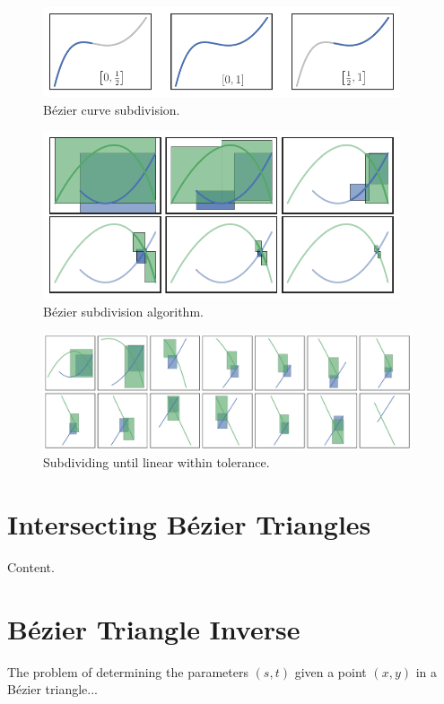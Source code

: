 \begin{figure}
  \includegraphics[width=0.9375\textwidth]{../images/curved-mesh/subdivide_curve.pdf}
  \centering
  \caption{B\'{e}zier curve subdivision.}
  \label{fig:bezier-curve-subdivision}
\end{figure}

\begin{figure}
  \includegraphics[width=0.9375\textwidth]{../images/curved-mesh/subdivision_process.pdf}
  \centering
  \caption{B\'{e}zier subdivision algorithm.}
  \label{fig:bezier-subdivision-process}
\end{figure}

\begin{figure}
  \includegraphics[width=0.96875\textwidth]{../images/curved-mesh/subdivision_linearized.pdf}
  \centering
  \caption{Subdividing until linear within tolerance.}
  \label{fig:bezier-subdivision-linearized}
\end{figure}

\section{Intersecting B\'{e}zier Triangles}

Content.

\section{B\'{e}zier Triangle Inverse}

The problem of determining the parameters \((s, t)\) given a point
\((x, y)\) in a B\'{e}zier triangle...
